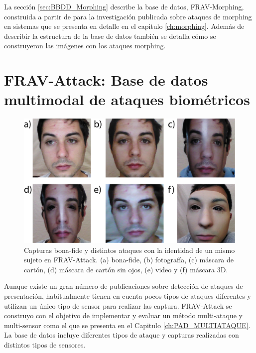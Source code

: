 La sección \ref{sec:BBDD_Morphing} describe la base de datos, \gls{FRAV-Morphing}, construida a partir de  para la investigación publicada sobre ataques de \gls{morphing} en sistemas  \cite{ortega2020border} que se presenta en detalle en el capitulo \ref{ch:morphing}. Además de describir la estructura de la base de datos también se detalla cómo se construyeron las imágenes con los ataques \gls{morphing}.


\section{FRAV-Attack: Base de datos multimodal de ataques biométricos}\label{sec:BBDD-FRAV-Attack}

\begin{figure}[t!]
\centering
\includegraphics[width=1\textwidth]{ch-sistemasABC/images/ch-BBDDs/ATAQUES.png}
    \caption{Capturas \gls{bona-fide} y distintos ataques con la identidad de un mismo sujeto en \Gls{FRAV-Attack}. (a) \gls{bona-fide}, (b)  fotografía, (c)  máscara de cartón, (d)  máscara de cartón  sin ojos, (e)   video y (f)  máscara $3$D.}
    \label{fig:DISTINTOS_ATAQUES_EN_FRAV_ATTACK}
\end{figure}

Aunque existe un gran número de publicaciones sobre detección de ataques de presentación, habitualmente tienen en cuenta pocos tipos de ataques diferentes y utilizan un único tipo de sensor para realizar las captura. \Gls{FRAV-Attack} se construyo con el objetivo de implementar y evaluar un método  multi-ataque y multi-sensor como el que se presenta en el Capitulo \ref{ch:PAD_MULTIATAQUE}. La base de datos incluye diferentes tipos de ataque y capturas realizadas con distintos tipos de sensores.

